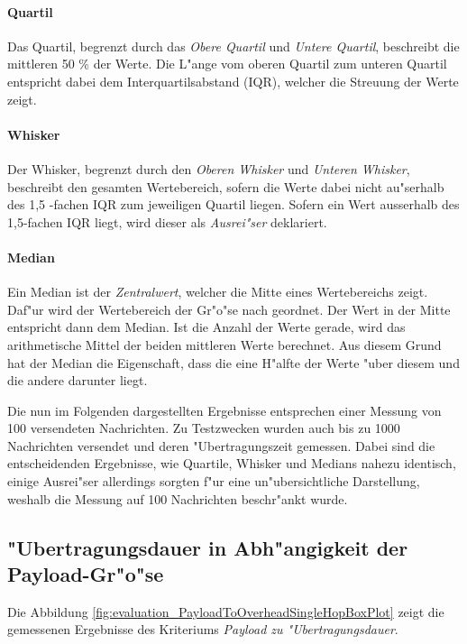 
\paragraph{Quartil}
Das Quartil, begrenzt durch das \emph{Obere Quartil} und \emph{Untere Quartil}, beschreibt die mittleren 50 \% der Werte. Die L"ange vom oberen Quartil zum unteren Quartil entspricht dabei dem Interquartilsabstand (IQR), welcher die Streuung der Werte zeigt.
\paragraph{Whisker}
Der Whisker, begrenzt durch den \emph{Oberen Whisker} und \emph{Unteren Whisker}, beschreibt den gesamten Wertebereich, sofern die Werte dabei nicht au"serhalb des 1,5 -fachen IQR zum jeweiligen Quartil liegen. Sofern ein Wert ausserhalb des 1,5-fachen IQR liegt, wird dieser als \emph{Ausrei"ser} deklariert.
\paragraph{Median}
Ein Median ist der \emph{Zentralwert}, welcher die Mitte eines Wertebereichs zeigt. Daf"ur wird der Wertebereich der Gr"o"se nach geordnet. Der Wert in der Mitte entspricht dann dem Median. Ist die Anzahl der Werte gerade, wird das arithmetische Mittel der beiden mittleren Werte berechnet. Aus diesem Grund hat der Median die Eigenschaft, dass die eine H"alfte der Werte "uber diesem und die andere darunter liegt.

Die nun im Folgenden dargestellten Ergebnisse entsprechen einer Messung von 100 versendeten Nachrichten. Zu Testzwecken wurden auch bis zu 1000 Nachrichten versendet und deren "Ubertragungszeit gemessen. Dabei sind die entscheidenden Ergebnisse, wie Quartile, Whisker und Medians nahezu identisch, einige Ausrei"ser allerdings sorgten f"ur eine un"ubersichtliche Darstellung, weshalb die Messung auf 100 Nachrichten beschr"ankt wurde.

\subsection{"Ubertragungsdauer in Abh"angigkeit der Payload-Gr"o"se}


Die Abbildung \ref{fig:evaluation_PayloadToOverheadSingleHopBoxPlot} zeigt die gemessenen Ergebnisse des Kriteriums \emph{Payload zu "Ubertragungsdauer}.

